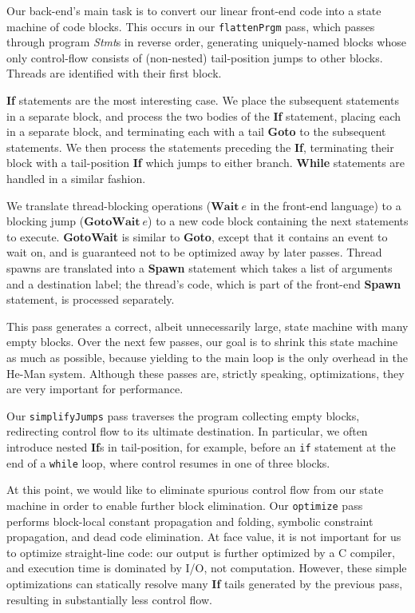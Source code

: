 \documentclass[preprint]{sigplanconf}
\renewcommand{\t}{\texttt}
\renewcommand{\b}{\textbf}
\renewcommand{\i}{\textit}
\begin{document}
Our back-end's main task is to convert our linear front-end code into a state
machine of code blocks. This occurs in our \t{flattenPrgm} pass, which passes
through program \i{Stmt}s in reverse order, generating uniquely-named blocks
whose only control-flow consists of (non-nested) tail-position jumps to other
blocks. Threads are identified with their first block.

\b{If} statements are the most interesting case. We place the subsequent
statements in a separate block, and process the two bodies of the \b{If}
statement, placing each in a separate block, and terminating each with a tail
\b{Goto} to the subsequent statements. We then process the statements preceding
the \b{If}, terminating their block with a tail-position \b{If} which jumps to
either branch. \b{While} statements are handled in a similar fashion.

We translate thread-blocking operations ($\b{Wait}~e$ in the front-end language)
to a blocking jump ($\b{GotoWait}~e$) to a new code block containing the next
statements to execute. \b{GotoWait} is similar to \b{Goto}, except that it
contains an event to wait on, and is guaranteed not to be optimized away by
later passes. Thread spawns are translated into a \b{Spawn} statement which
takes a list of arguments and a destination label; the thread's code, which is
part of the front-end \b{Spawn} statement, is processed separately.

This pass generates a correct, albeit unnecessarily large, state machine with
many empty blocks. Over the next few passes, our goal is to shrink this state
machine as much as possible, because yielding to the main loop is the only
overhead in the He-Man system. Although these passes are, strictly speaking,
optimizations, they are very important for performance.

Our \t{simplifyJumps} pass traverses the program collecting empty blocks,
redirecting control flow to its ultimate destination. In particular, we often
introduce nested \b{If}s in tail-position, for example, before an \t{if}
statement at the end of a \t{while} loop, where control resumes in one of three
blocks.

At this point, we would like to eliminate spurious control flow from our state
machine in order to enable further block elimination. Our \t{optimize} pass
performs block-local constant propagation and folding, symbolic constraint
propagation, and dead code elimination. At face value, it is not important for
us to optimize straight-line code: our output is further optimized by a C
compiler, and execution time is dominated by I/O, not computation. However,
these simple optimizations can statically resolve many \b{If} tails generated by
the previous pass, resulting in substantially less control flow.
\end{document}
